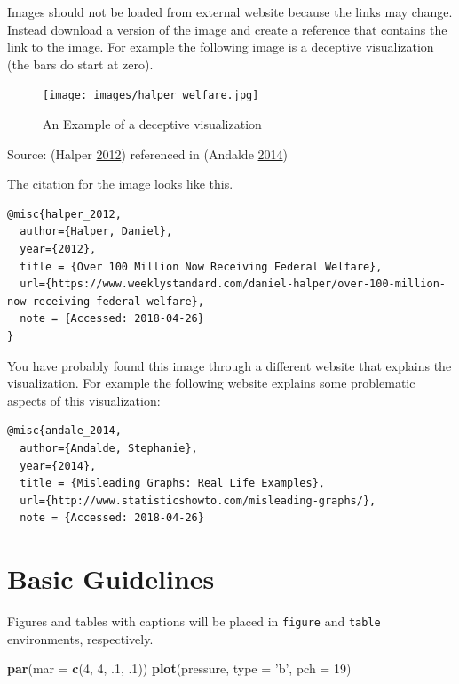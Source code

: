 \documentclass[]{book}
\newenvironment{Shaded}{\begin{snugshade}}{\end{snugshade}}
\newcommand{\DataTypeTok}[1]{\textcolor[rgb]{0.13,0.29,0.53}{#1}}
\newcommand{\DecValTok}[1]{\textcolor[rgb]{0.00,0.00,0.81}{#1}}
\newcommand{\FloatTok}[1]{\textcolor[rgb]{0.00,0.00,0.81}{#1}}
\newcommand{\KeywordTok}[1]{\textcolor[rgb]{0.13,0.29,0.53}{\textbf{#1}}}
\newcommand{\NormalTok}[1]{#1}
\newcommand{\StringTok}[1]{\textcolor[rgb]{0.31,0.60,0.02}{#1}}
\begin{document}
Images should not be loaded from external website because the links may change. Instead download a version of the image and create a reference that contains the link to the image. For example the following image is a deceptive visualization (the bars do start at zero).

\begin{figure}
\centering
\texttt{[image: images/halper\_welfare.jpg]}
\caption{An Example of a deceptive visualization}
\end{figure}

Source: (Halper \protect\hyperlink{ref-halper_2012}{2012}) referenced in (Andalde \protect\hyperlink{ref-andale_2014}{2014})

The citation for the image looks like this.

\begin{verbatim}
@misc{halper_2012,
  author={Halper, Daniel},
  year={2012},
  title = {Over 100 Million Now Receiving Federal Welfare},
  url={https://www.weeklystandard.com/daniel-halper/over-100-million-now-receiving-federal-welfare},
  note = {Accessed: 2018-04-26}
}
\end{verbatim}

You have probably found this image through a different website that explains the visualization. For example the following website explains some problematic aspects of this visualization:

\begin{verbatim}
@misc{andale_2014,
  author={Andalde, Stephanie},
  year={2014},
  title = {Misleading Graphs: Real Life Examples},
  url={http://www.statisticshowto.com/misleading-graphs/},
  note = {Accessed: 2018-04-26}
\end{verbatim}

\hypertarget{basic-guidelines}{%
\section{Basic Guidelines}\label{basic-guidelines}}

Figures and tables with captions will be placed in \texttt{figure} and \texttt{table} environments, respectively.

\begin{Shaded}
\begin{Highlighting}[]
\KeywordTok{par}\NormalTok{(}\DataTypeTok{mar =} \KeywordTok{c}\NormalTok{(}\DecValTok{4}\NormalTok{, }\DecValTok{4}\NormalTok{, }\FloatTok{.1}\NormalTok{, }\FloatTok{.1}\NormalTok{))}
\KeywordTok{plot}\NormalTok{(pressure, }\DataTypeTok{type =} \StringTok{'b'}\NormalTok{, }\DataTypeTok{pch =} \DecValTok{19}\NormalTok{)}
\end{Highlighting}
\end{Shaded}
\end{document}
